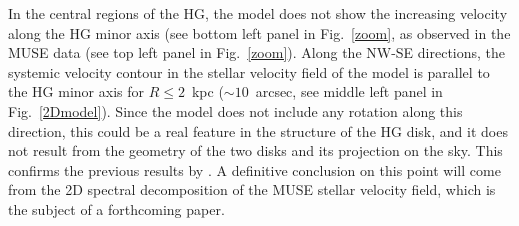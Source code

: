 \documentclass{aa}
\begin{document}
  In the central regions of the HG, the model does not show the increasing
  velocity along the HG minor axis (see bottom left
  panel in Fig.~\ref{zoom}, as observed in the MUSE data (see top left
  panel in Fig.~\ref{zoom}). Along the NW-SE directions, the systemic
  velocity contour  in the stellar velocity field of the
  model is parallel to the HG minor axis for $R \le 2$~kpc
  ($\sim 10$~arcsec, see middle left panel in
  Fig.~\ref{2Dmodel}). Since the model does not include any rotation
  along this direction, this could be a real feature in the structure
  of the HG disk, and it  does not result from the geometry of the two disks and its projection on the sky.
 This confirms  the previous results by \citet{Coccato2014}. A definitive conclusion on this point
  will come from the 2D spectral decomposition of the
  MUSE stellar velocity field, which is the subject of a forthcoming  paper.
\end{document}
